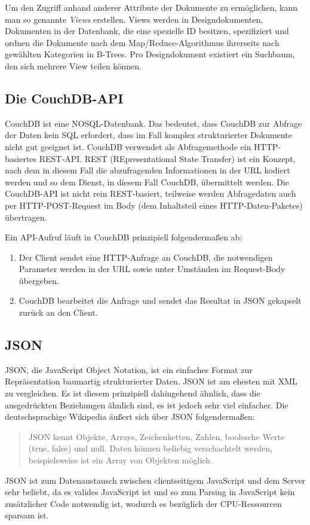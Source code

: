 \documentclass[12pt,ngerman,a4]{scrartcl}
\newcommand{\pquote}[1]{\glqq #1\grqq}
\begin{document}
Um den Zugriff anhand anderer Attribute der Dokumente zu ermöglichen, kann man so genannte \emph{Views} erstellen. Views werden in Designdokumenten, Dokumenten in der Datenbank, die eine spezielle ID besitzen, spezifiziert und ordnen die Dokumente nach dem Map/Reduce-Algorithmus %
ihrerseits nach gewählten Kategorien in B-Trees. Pro Designdokument existiert ein Suchbaum, den sich mehrere View teilen können.
\subsection{Die CouchDB-API}
CouchDB ist eine NOSQL-Datenbank. Das bedeutet, dass CouchDB zur Abfrage der Daten kein SQL erfordert, dass im Fall komplex strukturierter Dokumente nicht gut geeignet ist. CouchDB verwendet als Abfragemethode ein HTTP-basiertes REST-API. REST (REpresentational State Transfer) ist ein Konzept, nach dem in diesem Fall die abzufragenden Informationen in der URL kodiert werden und so dem Dienst, in diesem Fall CouchDB, übermittelt werden. Die CouchDB-API ist nicht rein REST-basiert, teilweise werden Abfragedaten auch per HTTP-POST-Request im Body (dem Inhaltsteil eines HTTP-Daten-\pquote{Paketes}) übertragen.

Ein API-Aufruf läuft in CouchDB prinzipiell folgendermaßen ab:
\begin{enumerate}
\item Der Client sendet eine HTTP-Anfrage an CouchDB, die notwendigen Parameter werden in der URL sowie unter Umständen im Request-Body übergeben.
\item CouchDB bearbeitet die Anfrage und sendet das Resultat in JSON gekapselt zurück an den Client.
\end{enumerate}
\subsection{JSON}
JSON, die JavaScript Object Notation, ist ein einfaches Format zur Repräsentation baumartig strukturierter Daten. JSON ist am ehesten mit XML zu vergleichen. Es ist diesem prinzipiell dahingehend ähnlich, dass die ausgedrückten Beziehungen ähnlich sind, es ist jedoch sehr viel einfacher. Die deutschsprachige Wikipedia äußert sich über JSON folgendermaßen:
\begin{quote}
JSON kennt Objekte, Arrays, Zeichenketten, Zahlen, boolesche Werte (true, false) und null. Daten können beliebig verschachtelt werden, beispielsweise ist ein Array von Objekten möglich.\cite{wpjson}
\end{quote}
JSON ist zum Datenaustausch zwischen clientseitigem JavaScript und dem Server sehr beliebt, da es valides JavaScript ist und so zum Parsing in JavaScript kein zusätzlicher Code notwendig ist, wodurch es bezüglich der CPU-Ressourcen sparsam ist.
\end{document}
